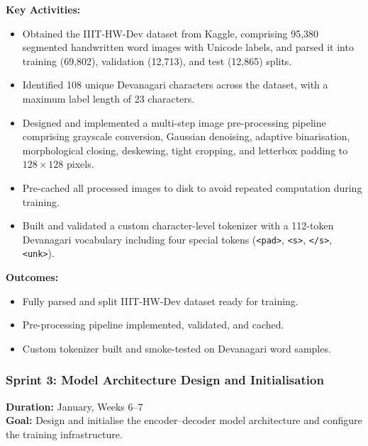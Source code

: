 \textbf{Key Activities:}
\begin{itemize}
    \item Obtained the IIIT-HW-Dev dataset from Kaggle, comprising 
    95,380 segmented handwritten word images with Unicode labels, 
    and parsed it into training (69,802), validation (12,713), and 
    test (12,865) splits.
    \item Identified 108 unique Devanagari characters across the 
    dataset, with a maximum label length of 23 characters.
    \item Designed and implemented a multi-step image pre-processing 
    pipeline comprising grayscale conversion, Gaussian denoising, 
    adaptive binarisation, morphological closing, deskewing, tight 
    cropping, and letterbox padding to $128 \times 128$ pixels.
    \item Pre-cached all processed images to disk to avoid repeated 
    computation during training.
    \item Built and validated a custom character-level tokenizer with 
    a 112-token Devanagari vocabulary including four special tokens 
    (\texttt{<pad>}, \texttt{<s>}, \texttt{</s>}, \texttt{<unk>}).
\end{itemize}

\textbf{Outcomes:}
\begin{itemize}
    \item Fully parsed and split IIIT-HW-Dev dataset ready for 
    training.
    \item Pre-processing pipeline implemented, validated, and cached.
    \item Custom tokenizer built and smoke-tested on Devanagari 
    word samples.
\end{itemize}

\subsubsection{Sprint 3: Model Architecture Design and Initialisation}
\textbf{Duration:} January, Weeks 6--7\\
\textbf{Goal:} Design and initialise the encoder--decoder model 
architecture and configure the training infrastructure.

